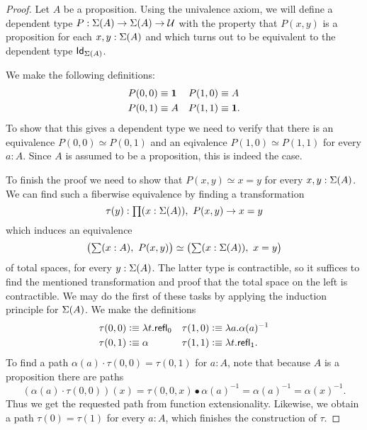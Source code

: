 \begin{proof}
Let $A$ be a proposition. Using the univalence axiom, we will define a 
dependent type $P:\Sigma(A)\to\Sigma(A)\to\mathcal{U}$ with the 
property that $P(x,y)$ is a proposition for each $x,y:\Sigma(A)$ 
and which turns out to be equivalent to the dependent type 
$\mathsf{Id}_{\Sigma(A)}$.

We make the following definitions:
\begin{align*}
P(0,0) & \equiv \mathbf{1} & P(1,0) & \equiv A\\
P(0,1) & \equiv A & P(1,1) & \equiv \mathbf{1}.
\end{align*}
To show that this gives a dependent type we need to verify that there 
is an equivalence $P(0,0)\simeq P(0,1)$ and an eqivalence 
$P(1,0)\simeq P(1,1)$ for every $a:A$. Since $A$ is assumed to 
be a proposition, this is indeed the case.

To finish the proof we need to show that $P(x,y)\simeq x=y$ 
for every $x,y:\Sigma(A)$. We can find such a fiberwise equivalence 
by finding a transformation
\begin{equation*}
\tau(y):\prd{x:\susp(A)} P(x,y)\to x=y
\end{equation*}
which induces an equivalence 
\begin{equation*}
\big(\sm{x:A} P(x,y)\big)\simeq\big(\sm{x:\susp(A)} x=y\big)
\end{equation*}
of total spaces, for every $y:\Sigma(A)$. The latter type 
is contractible, so it suffices to find the mentioned transformation 
and proof that the total space on the left is contractible. We may do 
the first of these tasks by applying the induction principle for 
$\Sigma(A)$. We make the definitions
\begin{align*}
\tau(0,0) & \vcentcolon\equiv \lambda t.\mathsf{refl}_{0} & \tau(1,0) &\vcentcolon\equiv \lambda a.\alpha(a)^{-1}\\
\tau(0,1) & \vcentcolon\equiv \alpha & \tau(1,1) &\vcentcolon\equiv \lambda t.\mathsf{refl}_{1}.
\end{align*}
To find a path $\alpha(a)\cdot\tau(0,0)=\tau(0,1)$ for $a:A$, 
note that because $A$ is a proposition there are paths
\begin{equation*}
(\alpha(a)\cdot\tau(0,0))(x)=\tau(0,0,x)\bullet\alpha(a)^{-1}
=\alpha(a)^{-1}= \alpha(x)^{-1}. 
\end{equation*}
Thus we get the requested path from function extensionality. Likewise, 
we obtain a path $\tau(0)=\tau(1)$ for every $a:A$, 
which finishes the construction of $\tau$.


\end{proof}
